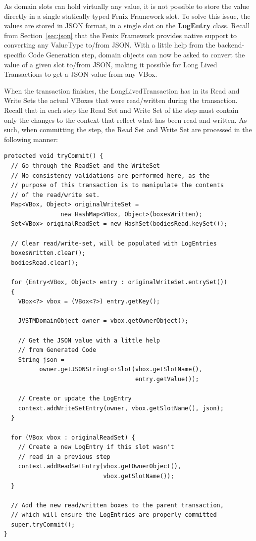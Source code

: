 As domain slots can hold virtually any value, it is not possible to
store the value directly in a single statically typed Fenix Framework
slot. To solve this issue, the values are stored in JSON format, in a
single slot on the {\bf LogEntry} class. Recall from
Section~\ref{sec:json} that the Fenix Framework provides native
support to converting any ValueType to/from JSON. With a little help
from the backend-specific Code Generation step, domain objects can now
be asked to convert the value of a given slot to/from JSON, making it
possible for Long Lived Transactions to get a JSON value from any
VBox.

When the transaction finishes, the LongLivedTransaction has in its
Read and Write Sets the actual VBoxes that were read/written during
the transaction. Recall that in each step the Read Set and Write Set
of the step must contain only the changes to the context that reflect
what has been read and written. As such, when committing the step, the
Read Set and Write Set are processed in the following manner:

\begin{lstlisting}[caption={Algorithm for committing a Long Lived
    Transaction's step}]
protected void tryCommit() {
  // Go through the ReadSet and the WriteSet
  // No consistency validations are performed here, as the 
  // purpose of this transaction is to manipulate the contents
  // of the read/write set.
  Map<VBox, Object> originalWriteSet = 
                new HashMap<VBox, Object>(boxesWritten);
  Set<VBox> originalReadSet = new HashSet(bodiesRead.keySet());

  // Clear read/write-set, will be populated with LogEntries
  boxesWritten.clear();
  bodiesRead.clear();

  for (Entry<VBox, Object> entry : originalWriteSet.entrySet()) 
  {
    VBox<?> vbox = (VBox<?>) entry.getKey();

    JVSTMDomainObject owner = vbox.getOwnerObject();

    // Get the JSON value with a little help
    // from Generated Code
    String json = 
          owner.getJSONStringForSlot(vbox.getSlotName(), 
                                     entry.getValue());

    // Create or update the LogEntry
    context.addWriteSetEntry(owner, vbox.getSlotName(), json);
  }

  for (VBox vbox : originalReadSet) {
    // Create a new LogEntry if this slot wasn't
    // read in a previous step
    context.addReadSetEntry(vbox.getOwnerObject(), 
                            vbox.getSlotName());
  }

  // Add the new read/written boxes to the parent transaction,
  // which will ensure the LogEntries are properly committed
  super.tryCommit();
}
\end{lstlisting}


